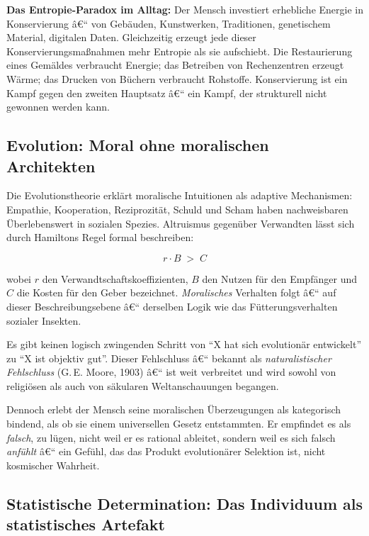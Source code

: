 ﻿\documentclass[12pt, a4paper]{article}
\begin{document}
\begin{infobox}
\textbf{Das Entropie-Paradox im Alltag:} Der Mensch investiert erhebliche
Energie in Konservierung â€“ von Gebäuden, Kunstwerken, Traditionen, genetischem
Material, digitalen Daten. Gleichzeitig erzeugt jede dieser Konservierungsmaßnahmen
mehr Entropie als sie aufschiebt. Die Restaurierung eines Gemäldes verbraucht
Energie; das Betreiben von Rechenzentren erzeugt Wärme; das Drucken von Büchern
verbraucht Rohstoffe. Konservierung ist ein Kampf gegen den zweiten Hauptsatz â€“
ein Kampf, der strukturell nicht gewonnen werden kann.
\end{infobox}

\subsection{Evolution: Moral ohne moralischen Architekten}

Die Evolutionstheorie erklärt moralische Intuitionen als adaptive Mechanismen:
Empathie, Kooperation, Reziprozität, Schuld und Scham haben nachweisbaren
Überlebenswert in sozialen Spezies. Altruismus gegenüber Verwandten lässt sich
durch Hamiltons Regel formal beschreiben:

\begin{equation}
  r \cdot B \;>\; C
\end{equation}

wobei $r$ den Verwandtschaftskoeffizienten, $B$ den Nutzen für den Empfänger
und $C$ die Kosten für den Geber bezeichnet. \emph{Moralisches} Verhalten
folgt â€“ auf dieser Beschreibungsebene â€“ derselben Logik wie das Fütterungsverhalten
sozialer Insekten.

Es gibt keinen logisch zwingenden Schritt von \enquote{X hat sich evolutionär
entwickelt} zu \enquote{X ist objektiv gut}. Dieser Fehlschluss â€“ bekannt als
\emph{naturalistischer Fehlschluss} (G.\,E. Moore, 1903) â€“ ist weit verbreitet
und wird sowohl von religiösen als auch von säkularen Weltanschauungen begangen.

Dennoch erlebt der Mensch seine moralischen Überzeugungen als kategorisch bindend,
als ob sie einem universellen Gesetz entstammten. Er empfindet es als \emph{falsch},
zu lügen, nicht weil er es rational ableitet, sondern weil es sich falsch
\emph{anfühlt} â€“ ein Gefühl, das das Produkt evolutionärer Selektion ist,
nicht kosmischer Wahrheit.

\subsection{Statistische Determination: Das Individuum als statistisches Artefakt}
\end{document}

